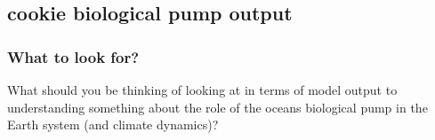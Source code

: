
\subsection{cookie biological pump output}


\subsubsection*{What to look for?}
 
What should you be thinking of looking at in terms of model output to understanding something about the role of the oceans biological pump in the Earth system (and climate dynamics)?

\vspace{1mm}

